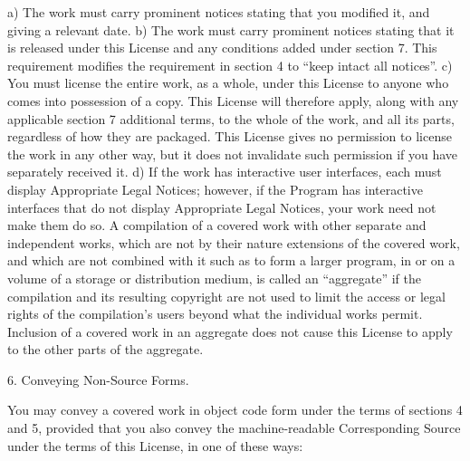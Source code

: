 \documentclass[letterpaper,12pt]{article}
\begin{document}
{a) The work must carry prominent notices stating that you modified it, and giving a relevant date.
b) The work must carry prominent notices stating that it is released under this License and any conditions added under section 7. This requirement modifies the requirement in section 4 to ``keep intact all notices''.
c) You must license the entire work, as a whole, under this License to anyone who comes into possession of a copy. This License will therefore apply, along with any applicable section 7 additional terms, to the whole of the work, and all its parts, regardless of how they are packaged. This License gives no permission to license the work in any other way, but it does not invalidate such permission if you have separately received it.
d) If the work has interactive user interfaces, each must display Appropriate Legal Notices; however, if the Program has interactive interfaces that do not display Appropriate Legal Notices, your work need not make them do so.
A compilation of a covered work with other separate and independent works, which are not by their nature extensions of the covered work, and which are not combined with it such as to form a larger program, in or on a volume of a storage or distribution medium, is called an ``aggregate'' if the compilation and its resulting copyright are not used to limit the access or legal rights of the compilation's users beyond what the individual works permit. Inclusion of a covered work in an aggregate does not cause this License to apply to the other parts of the aggregate.

6. Conveying Non-Source Forms.

You may convey a covered work in object code form under the terms of sections 4 and 5, provided that you also convey the machine-readable Corresponding Source under the terms of this License, in one of these ways:

}
\end{document}
